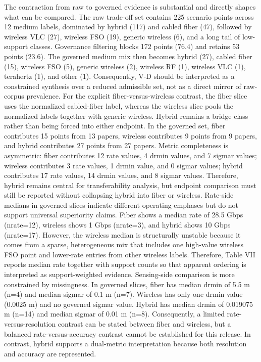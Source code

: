 {}The contraction from raw to governed evidence is substantial and directly shapes what can be compared. The raw trade-off set contains 225 scenario points across 12 medium labels, dominated by hybrid (117) and cabled fiber (47), followed by wireless VLC (27), wireless FSO (19), generic wireless (6), and a long tail of low-support classes. Governance filtering blocks 172 points (76.4\markdownRendererPercentSign{}) and retains 53 points (23.6\markdownRendererPercentSign{}). The governed medium mix then becomes hybrid (27), cabled fiber (15), wireless FSO (5), generic wireless (2), wireless RF (1), wireless VLC (1), terahertz (1), and other (1). Consequently, V-D should be interpreted as a constrained synthesis over a reduced admissible set, not as a direct mirror of raw-corpus prevalence.\markdownRendererParagraphSeparator
{}For the explicit fiber-versus-wireless contrast, the fiber slice uses the normalized cabled-fiber label, whereas the wireless slice pools the normalized  labels together with generic wireless. Hybrid remains a bridge class rather than being forced into either endpoint. In the governed set, fiber contributes 15 points from 13 papers, wireless contributes 9 points from 9 papers, and hybrid contributes 27 points from 27 papers. Metric completeness is asymmetric: fiber contributes 12 rate values, 4 drmin values, and 7 sigma\markdownRendererUnderscore{}r values; wireless contributes 3 rate values, 1 drmin value, and 0 sigma\markdownRendererUnderscore{}r values; hybrid contributes 17 rate values, 14 drmin values, and 8 sigma\markdownRendererUnderscore{}r values. Therefore, hybrid remains central for transferability analysis, but endpoint comparison must still be reported without collapsing hybrid into fiber or wireless.\markdownRendererParagraphSeparator
{}Rate-side medians in governed slices indicate different operating emphases but do not support universal superiority claims. Fiber shows a median rate of 28.5 Gbps (n\markdownRendererUnderscore{}rate=12), wireless shows 1 Gbps (n\markdownRendererUnderscore{}rate=3), and hybrid shows 10 Gbps (n\markdownRendererUnderscore{}rate=17). However, the wireless median is structurally unstable because it comes from a sparse, heterogeneous mix that includes one high-value wireless FSO point and lower-rate entries from other wireless labels. Therefore, Table VII reports median rate together with support counts so that apparent ordering is interpreted as support-weighted evidence.\markdownRendererParagraphSeparator
{}Sensing-side comparison is more constrained by missingness. In governed slices, fiber has median drmin of 5.5 m (n=4) and median sigma\markdownRendererUnderscore{}r of 0.1 m (n=7). Wireless has only one drmin value (0.0025 m) and no governed sigma\markdownRendererUnderscore{}r value. Hybrid has median drmin of 0.019075 m (n=14) and median sigma\markdownRendererUnderscore{}r of 0.01 m (n=8). Consequently, a limited rate-versus-resolution contrast can be stated between fiber and wireless, but a balanced rate-versus-accuracy contrast cannot be established for this release. In contrast, hybrid supports a dual-metric interpretation because both resolution and accuracy are represented.\markdownRendererParagraphSeparator
